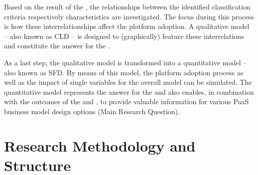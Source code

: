 Based on the result of the , the relationships between the identified classification criteria respectively characteristics are investigated. The focus during this process is how these interrelationships affect the platform adoption. A qualitative model -- also known as \ac{CLD} -- is designed to (graphically) feature these interrelations and constitute the answer for the .

As a last step, the qualitative model is transformed into a quantitative model -- also known as \ac{SFD}. By means of this model, the platform adoption process as well as the impact of single variables for the overall model can be simulated. The quantitative model represents the answer for the  and also enables, in combination with the outcomes of the  and , to provide valuable information for various \ac{PaaS} business model design options (Main Research Question).
	
\section{Research Methodology and Structure}\label{ch:intro:met}


